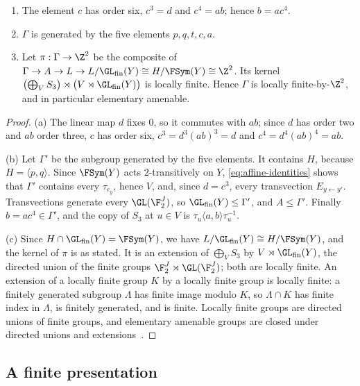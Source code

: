 \begin{lemma}\label{lem:structure}
\begin{enumerate}[label=(\alph*),itemsep=1pt]
\item The element $c$ has order six, $c^3=d$ and $c^4=ab$; hence $b=ac^4$.
\item $\Gamma$ is generated by the five elements $p,q,t,c,a$.
\item Let $\pi:\Gamma\to\Z^2$ be the composite of $\Gamma\to A\to L\to L/\GL_{\rm fin}(Y)\cong H/\FSym(Y)\cong\Z^2$. Its kernel
$\bigl(\bigoplus_VS_3\bigr)\rtimes\bigl(V\rtimes\GL_{\rm fin}(Y)\bigr)$ is locally finite. Hence $\Gamma$ is locally finite-by-$\Z^2$, and in
particular elementary amenable.
\end{enumerate}
\end{lemma}

\begin{proof}
(a) The linear map $d$ fixes $0$, so it commutes with $ab$; since $d$ has order two and $ab$ order three, $c$ has order six, $c^3=d^3(ab)^3=d$ and
$c^4=d^4(ab)^4=ab$.

(b) Let $\Gamma'$ be the subgroup generated by the five elements. It contains $H$, because $H=\langle p,q\rangle$. Since $\FSym(Y)$ acts
$2$-transitively on $Y$, \eqref{eq:affine-identities} shows that $\Gamma'$ contains every $\tau_{e_y}$, hence $V$, and, since $d=c^3$, every
transvection $E_{y\leftarrow y'}$. Transvections generate every $\GL(\F_2^J)$, so $\GL_{\rm fin}(Y)\le\Gamma'$, and $A\le\Gamma'$. Finally
$b=ac^4\in\Gamma'$, and the copy of $S_3$ at $u\in V$ is $\tau_u\langle a,b\rangle\tau_u^{-1}$.

(c) Since $H\cap\GL_{\rm fin}(Y)=\FSym(Y)$, we have $L/\GL_{\rm fin}(Y)\cong H/\FSym(Y)$, and the kernel of $\pi$ is as stated. It is an
extension of $\bigoplus_VS_3$ by $V\rtimes\GL_{\rm fin}(Y)$, the directed union of the finite groups $\F_2^J\rtimes\GL(\F_2^J)$; both are locally
finite. An extension of a locally finite group $K$ by a locally finite group is locally finite: a finitely generated subgroup $\Lambda$ has finite
image modulo $K$, so $\Lambda\cap K$ has finite index in $\Lambda$, is finitely generated, and is finite. Locally finite groups are directed
unions of finite groups, and elementary amenable groups are closed under directed unions and extensions~\cite{Chou1980}.
\end{proof}

\subsection{A finite presentation}\label{sec:fp}


